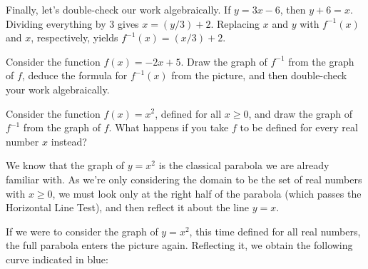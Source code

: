\documentclass[nooutcomes]{ximera}
\begin{document}
\begin{example}
\begin{explanation}
    Finally, let's double-check our work algebraically. If $y=3x-6$, then $y+6 = x$. Dividing everything by $3$ gives $x = (y/3)+2$. Replacing $x$ and $y$ with $f^{-1}(x)$ and $x$, respectively, yields $f^{-1}(x) = (x/3)+2$.
  \end{explanation}
\end{example}

\begin{exploration}
  Consider the function $f(x) = -2x+5$. Draw the graph of $f^{-1}$ from the graph of $f$, deduce the formula for $f^{-1}(x)$ from the picture, and then double-check your work algebraically.
\end{exploration}

\begin{example}
  Consider the function $f(x) = x^2$, defined for all $x\geq 0$, and draw the graph of $f^{-1}$ from the graph of $f$. What happens if you take $f$ to be defined for every real number $x$ instead?

  \begin{explanation}
    We know that the graph of $y=x^2$ is the classical parabola we are already familiar with. As we're only considering the domain to be the set of real numbers with $x \geq 0$, we must look only at the right half of the parabola (which passes the Horizontal Line Test), and then reflect it about the line $y=x$.

    \begin{image}
    \end{image}
    
    If we were to consider the graph of $y=x^2$, this time defined for all real numbers, the full parabola enters the picture again. Reflecting it, we obtain the following curve indicated in blue:
    
    \begin{image}
    \end{image}


\end{explanation}
\end{example}
\end{document}
